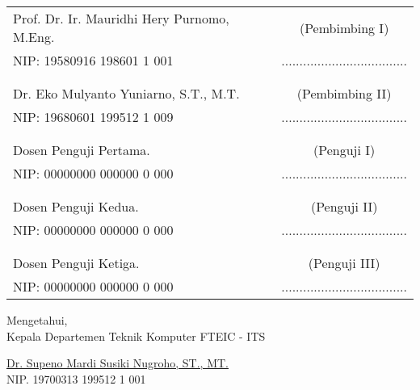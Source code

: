     \noindent
    \begin{tabularx}{\textwidth}{X c}
      Prof. Dr. Ir. Mauridhi Hery Purnomo, M.Eng.          & (Pembimbing I) \\
      NIP: 	19580916 198601 1 001       & ................................... \\
      &  \\
      &  \\
      Dr. Eko Mulyanto Yuniarno, S.T., M.T.     & (Pembimbing II) \\
      NIP: 19680601 199512 1 009        & ................................... \\
      &  \\
      &  \\
      Dosen Penguji Pertama.  & (Penguji I) \\
      NIP: 00000000 000000 0 000        & ................................... \\
      &  \\
      &  \\
      Dosen Penguji Kedua.  & (Penguji II) \\
      NIP: 00000000 000000 0 000        & ................................... \\
      &  \\
      &  \\
      Dosen Penguji Ketiga.             & (Penguji III) \\
      NIP: 00000000 000000 0 000        & ................................... \\
    \end{tabularx}
  \endgroup

  \vspace{1ex}

  \begin{center}
    Mengetahui, \\
    Kepala Departemen Teknik Komputer FTEIC - ITS \\

    \vspace{7ex}

    \underline{Dr. Supeno Mardi Susiki Nugroho, ST., MT.} \\
    NIP. 19700313 199512 1 001
  \end{center}
\endgroup
